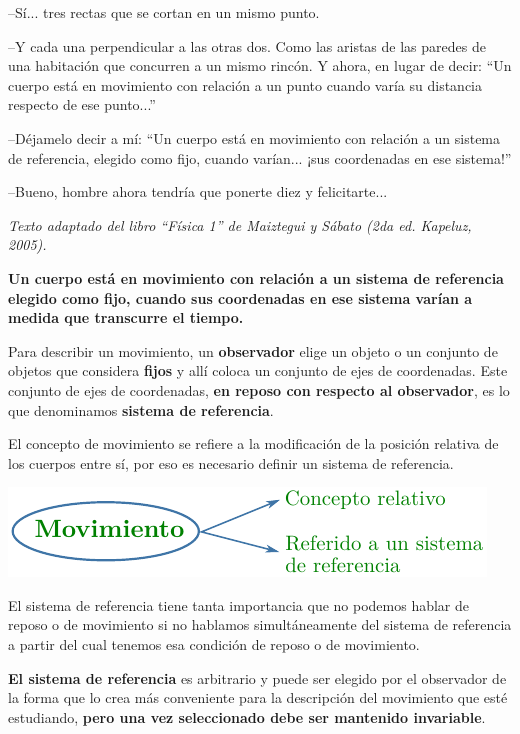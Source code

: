 {{  --Sí... tres rectas que se cortan en un mismo punto.
   
  --Y cada una perpendicular a las otras dos. Como las aristas de las paredes de una habitación que concurren a un mismo rincón. Y ahora, en lugar de decir: “Un cuerpo está en movimiento con relación a un punto cuando varía su distancia respecto de ese punto...”
   
  --Déjamelo decir a mí: ``Un cuerpo está en movimiento con relación a un sistema de referencia, elegido como fijo, cuando varían... ¡sus coordenadas en ese sistema!''
   
  --Bueno, hombre ahora tendría que ponerte diez y felicitarte...

  \bigskip
   \begin{flushright}
  {   \small{\it Texto adaptado del libro ``Física 1'' de Maiztegui y Sábato (2da ed. Kapeluz, 2005).}}
\end{flushright}
}}



{\bf Un cuerpo está en movimiento con relación a un sistema de referencia elegido como fijo, cuando sus coordenadas en ese sistema varían a medida que transcurre el tiempo.}



Para describir un movimiento, un {\bf observador} elige un objeto o un conjunto de objetos que considera {\bf fijos} y allí coloca un conjunto de ejes de coordenadas. Este conjunto de ejes de coordenadas, {\bf en reposo con respecto al observador}, es lo que denominamos {\bf sistema de referencia}.

El concepto de movimiento se refiere a la modificación de la posición relativa de los cuerpos entre sí, por eso es necesario definir un sistema de referencia.
\begin{center}
  \includegraphics[scale=1.2]{img/movimiento.pdf}
\end{center}

El sistema de referencia tiene tanta importancia que no podemos hablar de reposo o de movimiento si no hablamos simultáneamente del sistema de referencia a partir del cual tenemos esa condición de reposo o de movimiento.

{\bf El sistema de referencia} es arbitrario y puede ser elegido por el observador de la forma que lo crea más conveniente para la descripción del movimiento que esté estudiando, {\bf pero una vez seleccionado debe ser mantenido invariable}.


